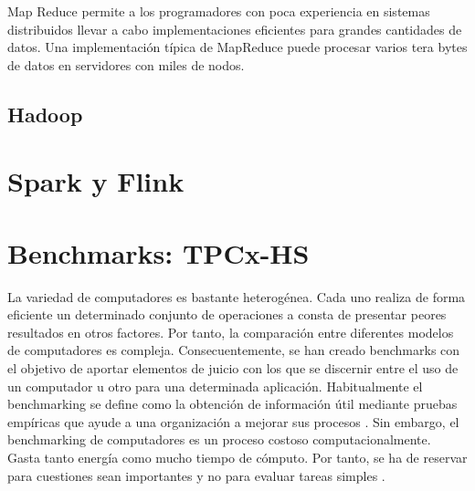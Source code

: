 \documentclass[10pt]{article}
\begin{document}
		Map Reduce permite a los programadores con poca experiencia en sistemas distribuidos llevar a cabo implementaciones eficientes para grandes cantidades de datos. Una implementación típica de MapReduce puede procesar varios tera bytes de datos en servidores con miles de nodos.


	\subsection{Hadoop} \label{sec:mr-hadoop:hadoop}


\section{Spark y Flink} \label{sec:spark-flink}



\section{Benchmarks: TPCx-HS} \label{sec:tpcx-hs}

	La variedad de computadores es bastante heterogénea. Cada uno realiza de forma eficiente un determinado conjunto de operaciones a consta de presentar peores resultados en otros factores. Por tanto, la comparación entre diferentes modelos de computadores es compleja. Consecuentemente, se han creado benchmarks con el objetivo de aportar elementos de juicio con los que se discernir entre el uso de un computador u otro para una determinada aplicación. Habitualmente el benchmarking se define como la obtención de información útil mediante pruebas empíricas que ayude a una organización a mejorar sus procesos \cite{benchmarking}. Sin embargo, el benchmarking de computadores es un proceso costoso computacionalmente. Gasta tanto energía como mucho tiempo de cómputo. Por tanto, se ha de reservar para cuestiones sean importantes y no para evaluar tareas simples \cite{desv-bench}.
	
\end{document}
